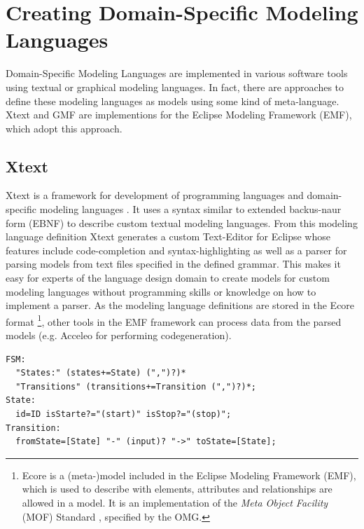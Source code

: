 \documentclass[runningheads,a4paper]{llncs}
\begin{document}
    \section{Creating Domain-Specific Modeling Languages}
    \label{section:creatingdsmls}
    Domain-Specific Modeling Languages are implemented in various software tools using textual or graphical modeling languages.
    In fact, there are approaches to define these modeling languages as models using some kind of meta-language.
    Xtext and GMF are implementions for the Eclipse Modeling Framework (EMF), which adopt this approach.
    
    \subsection{Xtext}
    Xtext is a framework for development of programming languages and domain-specific modeling languages \cite{eysholdt2010xtext}.
    It uses a syntax similar to extended backus-naur form (EBNF) to describe custom textual modeling languages. 
    From this modeling language definition Xtext generates a custom Text-Editor for Eclipse whose features include code-completion and syntax-highlighting
    as well as a parser for parsing models from text files specified in the defined grammar. This makes it easy for experts of the language design
    domain to create models for custom modeling languages without programming skills or knowledge on how to implement a parser.
    As the modeling language definitions are stored in the Ecore format \footnote{Ecore is a (meta-)model included in the Eclipse Modeling Framework (EMF), which is used to describe with elements, attributes and relationships are allowed 
    in a model. It is an implementation of the \emph{Meta Object Facility} (MOF) Standard \cite{mof20062}, specified by the OMG.}, other tools in the EMF framework can process data from the parsed 
    models (e.g. Acceleo\cite{musset2006acceleo} for performing codegeneration).  

\begin{lstlisting}[captionpos=b, label={fig:fsmgrammar}]
FSM: 
  "States:" (states+=State) (",")?)* 
  "Transitions" (transitions+=Transition (",")?)*;
State: 
  id=ID isStarte?="(start)" isStop?="(stop)";
Transition: 
  fromState=[State] "-" (input)? "->" toState=[State];
\end{lstlisting}
%    
\end{document}
